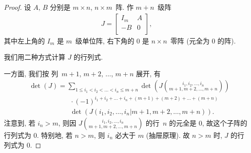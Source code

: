 \documentclass[%
    UTF8,%
    fontset=none,%
    punct=kaiming,%
    zihao=-4,%
    a4paper,%
    oneside,%
]{ctexbook}
\renewcommand*{\leq}{\leqslant}
\begin{document}
\begin{proof}
    设 \(A\), \(B\) 分别是
    \(m \times n\), \(n \times m\)~阵.
    作 \(m + n\)~级阵
    \begin{align*}
        J =
        \begin{bmatrix}
            I_m & A \\
            -B  & 0 \\
        \end{bmatrix},
    \end{align*}
    其中左上角的 \(I_m\) 是 \(m\)~级单位阵,
    右下角的 \(0\) 是 \(n \times n\)~零阵
    (元全为 \(0\) 的阵).

    我们用二种方式计算 \(J\) 的行列式.

    一方面, 我们按%
    列~\(m + 1\), \(m + 2\), \(\dots\), \(m + n\) 展开,
    有
    \begin{align*}
         &
        \det {(J)}
        = \sum_{1 \leq i_1 < i_2 < \dots < i_n \leq m+n}
        {\det {\left(
                J\binom{i_1,i_2,\dots,i_n}{m+1,m+2,\dots,m+n}
                \right)}}
        \\
         &
        \qquad \qquad \qquad
        \cdot (-1)^{i_1 + i_2 + \dots + i_n
            + (m+1) + (m+2) + \dots + (m+n)}
        \\
         &
        \qquad \qquad \qquad
        \det {(J({i_1,i_2,\dots,i_n}|{m+1,m+2,\dots,m+n}))}.
    \end{align*}
    注意到, 若 \(i_n > m\), 则因
    \(\displaystyle
    J\binom{i_1,i_2,\dots,i_n}{m+1,m+2,\dots,m+n}\)
    的行~\(n\) 的元全是 \(0\),
    故这个子阵的行列式为 \(0\).
    特别地, 若 \(n > m\), 则 \(i_n\) 必大于 \(m\)
    (抽屉原理).
    故 \(n > m\) 时, \(J\) 的行列式为 \(0\).


\end{proof}
\end{document}
